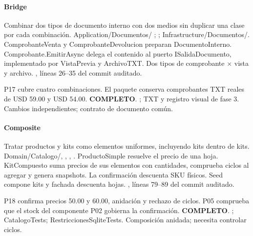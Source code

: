 \paragraph{Bridge}
 Combinar dos tipos de documento interno con dos medios sin duplicar una clase por cada combinación.
 Application/Documentos/ ; ; Infrastructure/Documentos/. ComprobanteVenta y ComprobanteDevolucion preparan DocumentoInterno. Comprobante.EmitirAsync delega el contenido al puerto ISalidaDocumento, implementado por VistaPrevia y ArchivoTXT.
 Dos tipos de comprobante $\times$ vista y archivo.
 , líneas 26--35 del commit auditado.

 P17 cubre cuatro combinaciones. El paquete conserva comprobantes TXT reales de USD 59.00 y USD 54.00. \textbf{COMPLETO}.
 ; TXT y registro visual de fase 3.
 Cambios independientes; contrato de documento común.
\medskip
\clearpage
\paragraph{Composite}
 Tratar productos y kits como elementos uniformes, incluyendo kits dentro de kits.
 Domain/Catalogo/, , , . ProductoSimple resuelve el precio de una hoja. KitCompuesto suma precios de sus elementos con cantidades, comprueba ciclos al agregar y genera snapshots. La confirmación descuenta SKU físicos.
 Seed compone kits y fachada descuenta hojas.
 , líneas 79--89 del commit auditado.

 P18 confirma precios 50.00 y 60.00, anidación y rechazo de ciclos. P05 comprueba que el stock del componente P02 gobierna la confirmación. \textbf{COMPLETO}.
 ; CatalogoTests; RestriccionesSqliteTests.
 Composición anidada; necesita controlar ciclos.
\medskip
\clearpage
